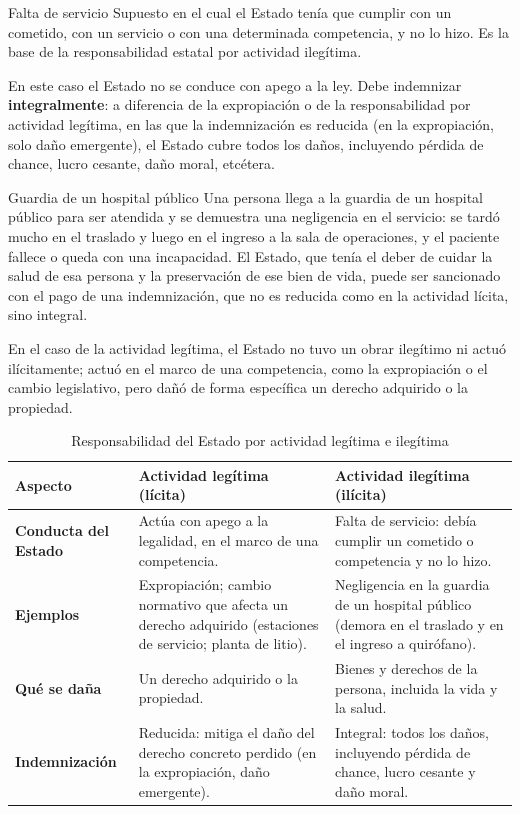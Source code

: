 \documentclass[12pt,oneside]{book}
\begin{document}
\begin{definition}{Falta de servicio}
Supuesto en el cual el Estado tenía que cumplir con un cometido, con un servicio o con una determinada competencia, y no lo hizo. Es la base de la responsabilidad estatal por actividad ilegítima.
\end{definition}

En este caso el Estado no se conduce con apego a la ley. Debe indemnizar \textbf{integralmente}: a diferencia de la expropiación o de la responsabilidad por actividad legítima, en las que la indemnización es reducida (en la expropiación, solo daño emergente), el Estado cubre todos los daños, incluyendo pérdida de chance, lucro cesante, daño moral, etcétera.

\begin{example}{Guardia de un hospital público}
Una persona llega a la guardia de un hospital público para ser atendida y se demuestra una negligencia en el servicio: se tardó mucho en el traslado y luego en el ingreso a la sala de operaciones, y el paciente fallece o queda con una incapacidad. El Estado, que tenía el deber de cuidar la salud de esa persona y la preservación de ese bien de vida, puede ser sancionado con el pago de una indemnización, que no es reducida como en la actividad lícita, sino integral.
\end{example}

En el caso de la actividad legítima, el Estado no tuvo un obrar ilegítimo ni actuó ilícitamente; actuó en el marco de una competencia, como la expropiación o el cambio legislativo, pero dañó de forma específica un derecho adquirido o la propiedad.

\begin{table}[H]
\centering
\small
\caption{Responsabilidad del Estado por actividad legítima e ilegítima}
\begin{tabularx}{\textwidth}{>{\raggedright\arraybackslash\bfseries}p{2.4cm} >{\raggedright\arraybackslash}X >{\raggedright\arraybackslash}X}
\toprule
Aspecto & Actividad legítima (lícita) & Actividad ilegítima (ilícita) \\
\midrule
Conducta del Estado & Actúa con apego a la legalidad, en el marco de una competencia. & Falta de servicio: debía cumplir un cometido o competencia y no lo hizo. \\
Ejemplos & Expropiación; cambio normativo que afecta un derecho adquirido (estaciones de servicio; planta de litio). & Negligencia en la guardia de un hospital público (demora en el traslado y en el ingreso a quirófano). \\
Qué se daña & Un derecho adquirido o la propiedad. & Bienes y derechos de la persona, incluida la vida y la salud. \\
Indemnización & Reducida: mitiga el daño del derecho concreto perdido (en la expropiación, daño emergente). & Integral: todos los daños, incluyendo pérdida de chance, lucro cesante y daño moral. \\
\bottomrule
\end{tabularx}
\end{table}
\end{document}
